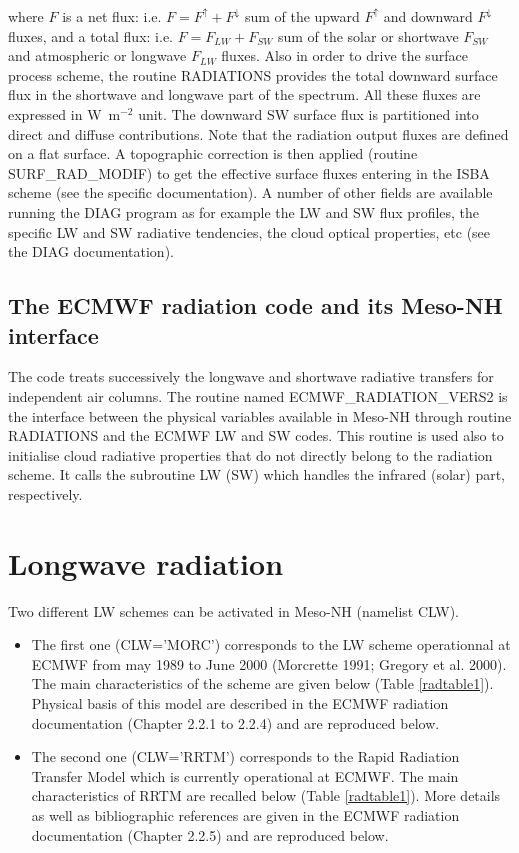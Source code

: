 \noindent where $F$ is a net flux: i.e. $F = F^{\!\uparrow} + F^{\!\downarrow}$
sum of the upward $F^{\!\uparrow}$ and downward $F^{\!\downarrow}$ fluxes,
and a total flux: i.e. $F = F_{LW} + F_{SW}$ sum of the solar or
shortwave $F_{SW}$ and atmospheric or longwave $F_{LW}$ fluxes. Also in order
to drive the surface process scheme, the routine RADIATIONS provides the
total downward surface flux in the shortwave and longwave 
part of the spectrum. All these fluxes are expressed in W~m$^{-2}$ unit.
The downward SW surface flux is partitioned into direct and diffuse contributions. Note that the radiation output fluxes are defined on a flat surface. A topographic correction is then applied (routine SURF\_RAD\_MODIF) to get the effective surface fluxes entering in the ISBA scheme (see the specific documentation). A number of other fields are available running the DIAG program as for example the LW and SW flux profiles, the specific LW and SW radiative tendencies, the cloud optical properties, etc (see the DIAG documentation).\\
%
\subsection{The ECMWF radiation code and its Meso-NH interface}
%
The code treats successively the longwave and shortwave radiative transfers for independent air columns. The routine named ECMWF\_RADIATION\_VERS2 is the interface between the physical variables available in Meso-NH through routine RADIATIONS and the ECMWF LW and SW codes. This routine is used also to initialise cloud radiative properties that do not directly belong to the radiation scheme. It calls the subroutine LW (SW) which handles the infrared (solar) part, respectively. \\

\section{Longwave radiation}

Two different LW schemes can be activated in Meso-NH (namelist CLW).

\begin{itemize}

 \item The first one (CLW='MORC') corresponds to the LW scheme operationnal at ECMWF from may 1989
to June 2000 (Morcrette 1991; Gregory et al. 2000). The main characteristics of the scheme are given
below (Table \ref{radtable1}). Physical basis of this model are described in the ECMWF radiation documentation (Chapter 2.2.1 to 2.2.4) and are reproduced below.


 \item  The second one (CLW='RRTM') corresponds to the Rapid Radiation Transfer Model which is currently operational at ECMWF. The main characteristics of RRTM are recalled below (Table \ref{radtable1}). More details as well as bibliographic references are given in the ECMWF radiation documentation (Chapter 2.2.5) and are reproduced below.

\end{itemize}

